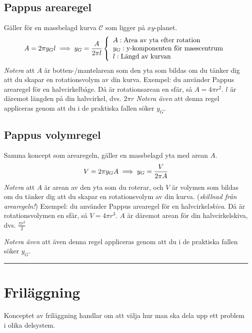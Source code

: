 \documentclass{article}
\newenvironment{ankiflashcard}[1][ ]{}{}
\newcommand{\ruler}{
\rule{0.5\textwidth}{0.5pt}
}
\begin{document}
\begin{paracol}{2}
\begin{ankiflashcard}
\subsection{Pappus arearegel}
Gäller för en massbelagd kurva $\mathcal C$ som ligger på $xy$-planet.
$$
A=2\pi y_G l\\ \implies y_G = \frac{A}{2\pi l}\left\{\begin{array}{l}A: \text{Area av yta efter rotation} \\y_G: \text{y-komponenten för masscentrum} \\l: \text{Längd av kurvan} \\\end{array}\right.
$$
\textit{Notera} att $A$ är botten-/mantelarean som den yta som bildas om du tänker dig att du skapar en rotationsvolym av din kurva.
Exempel: du använder Pappus arearegel för en halvcirkelbåge. Då är rotationsarean en sfär, så $A = 4\pi r^2$. $l$ är däremot längden på din halvcirkel, dvs. $2\pi r$
\textit{Notera även} att denna regel appliceras genom att du i de praktiska fallen söker $y_G$.
\end{ankiflashcard}

\begin{ankiflashcard}
    \subsection{Pappus volymregel}
Samma koncept som arearegeln, gäller en massbelagd yta med arean $A$.
$$
V = 2\pi y_G A\\
\implies y_G = \frac{V}{2\pi A}
$$
\textit{Notera} att $A$ är arean av den yta som du roterar, och $V$ är volymen som bildas om du tänker dig att du skapar en rotationsvolym av din kurva.
(\textit{skillnad från arearegeln!})
Exempel: du använder Pappus arearegel för en halvcirkel\textit{skiva}. Då är rotationsvolymen en sfär, så $V = 4\pi r^3$. $A$ är däremot arean för din halvcirkelskiva, dvs. $\frac{\pi r^2}{2}$


\textit{Notera även} att även denna regel appliceras genom att du i de praktiska fallen söker $y_G$.
\end{ankiflashcard}

\ruler
\section{Friläggning}
Konceptet av friläggning handlar om att välja hur man ska dela upp ett problem i olika delsystem.


\end{paracol}
\end{document}
